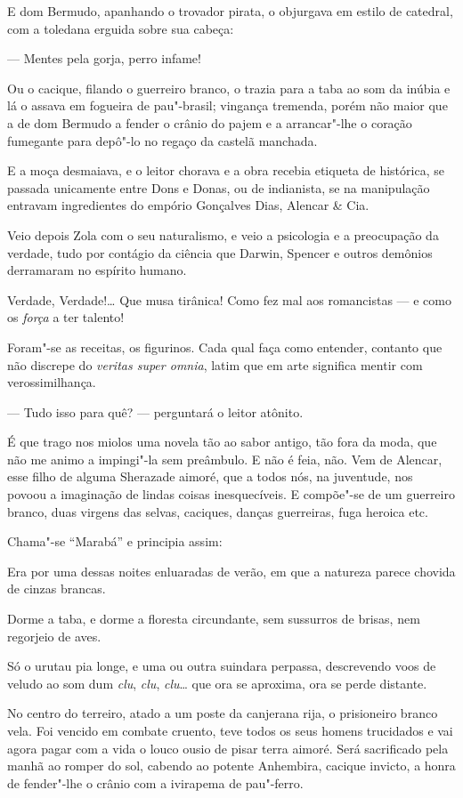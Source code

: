 E dom Bermudo, apanhando o trovador pirata, o objurgava em estilo de
catedral, com a toledana erguida sobre sua cabeça:

--- Mentes pela gorja, perro infame!

Ou o cacique, filando o guerreiro branco, o trazia para a taba ao som da
inúbia e lá o assava em fogueira de pau"-brasil; vingança tremenda, porém
não maior que a de dom Bermudo a fender o crânio do pajem e a
arrancar"-lhe o coração fumegante para depô"-lo no regaço da castelã
manchada.

E a moça desmaiava, e o leitor chorava e a obra recebia etiqueta de
histórica, se passada unicamente entre Dons e Donas, ou de indianista,
se na manipulação entravam ingredientes do empório Gonçalves Dias,
Alencar \& Cia.

Veio depois Zola com o seu naturalismo, e veio a psicologia e a
preocupação da verdade, tudo por contágio da ciência que Darwin, Spencer
e outros demônios derramaram no espírito humano.

Verdade, Verdade!\ldots{} Que musa tirânica! Como fez mal aos romancistas ---
e como os \emph{força} a ter talento!

Foram"-se as receitas, os figurinos. Cada qual faça como entender,
contanto que não discrepe do \emph{veritas super omnia}, latim que em
arte significa mentir com verossimilhança.

--- Tudo isso para quê? --- perguntará o leitor atônito.

É que trago nos miolos uma novela tão ao sabor antigo, tão fora da moda,
que não me animo a impingi"-la sem preâmbulo. E não é feia, não. Vem de
Alencar, esse filho de alguma Sherazade aimoré, que a todos nós, na
juventude, nos povoou a imaginação de lindas coisas inesquecíveis. E
compõe"-se de um guerreiro branco, duas virgens das selvas, caciques,
danças guerreiras, fuga heroica etc.

Chama"-se ``Marabá'' e principia assim:

Era por uma dessas noites enluaradas de verão, em que a natureza parece
chovida de cinzas brancas.

Dorme a taba, e dorme a floresta circundante, sem sussurros de brisas,
nem regorjeio de aves.

Só o urutau pia longe, e uma ou outra suindara perpassa, descrevendo
voos de veludo ao som dum \emph{clu}, \emph{clu}, \emph{clu}\ldots{} que ora
se aproxima, ora se perde distante.

No centro do terreiro, atado a um poste da canjerana rija, o prisioneiro
branco vela. Foi vencido em combate cruento, teve todos os seus homens
trucidados e vai agora pagar com a vida o louco ousio de pisar terra
aimoré. Será sacrificado pela manhã ao romper do sol, cabendo ao potente
Anhembira, cacique invicto, a honra de fender"-lhe o crânio com a
ivirapema de pau"-ferro.

